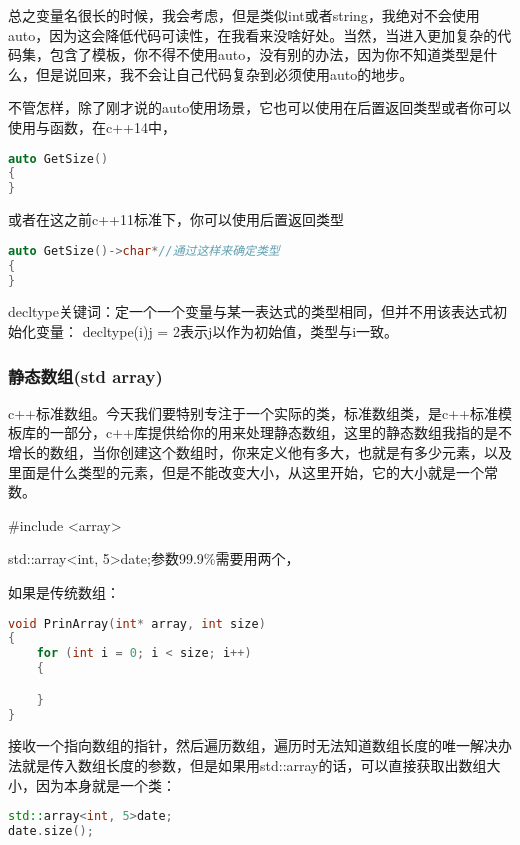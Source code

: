 总之变量名很长的时候，我会考虑，但是类似{\ncodestyle int}或者{\ncodestyle string}，我绝对不会使用{\ncodestyle auto}，因为这会降低代码可读性，在我看来没啥好处。当然，当进入更加复杂的代码集，包含了模板，你不得不使用{\ncodestyle auto}，没有别的办法，因为你不知道类型是什么，但是说回来，我不会让自己代码复杂到必须使用{\ncodestyle auto}的地步。

不管怎样，除了刚才说的{\ncodestyle auto}使用场景，它也可以使用在后置返回类型或者你可以使用与函数，在c++14中，

\begin{lstlisting}[language=c++]
auto GetSize()
{
}
\end{lstlisting}
或者在这之前c++11标准下，你可以使用后置返回类型
\begin{lstlisting}[language=c++]
auto GetSize()->char*//通过这样来确定类型
{
}
\end{lstlisting}

{\ncodestyle decltype}关键词：定一个一个变量与某一表达式的类型相同，但并不用该表达式初始化变量：
{\ncodestyle decltype(i)j = 2}表示{\ncodestyle j}以{}作为初始值，类型与{\ncodestyle i}一致。


\subsubsection{静态数组(std array)}

c++标准数组。今天我们要特别专注于一个实际的类，标准数组类，是c++标准模板库的一部分，c++库提供给你的用来处理静态数组，这里的静态数组我指的是不增长的数组，当你创建这个数组时，你来定义他有多大，也就是有多少元素，以及里面是什么类型的元素，但是不能改变大小，从这里开始，它的大小就是一个常数。

{\ncodestyle \#include <array>}

{\ncodestyle std::array<int, 5>date;}参数99.9\%需要用两个，

如果是传统数组：
\begin{lstlisting}[language=c++]
void PrinArray(int* array, int size)
{
    for (int i = 0; i < size; i++)
    {

    }
}
\end{lstlisting}

接收一个指向数组的指针，然后遍历数组，遍历时无法知道数组长度的唯一解决办法就是传入数组长度的参数，但是如果用{\ncodestyle std::array}的话，可以直接获取出数组大小，因为本身就是一个类：

\begin{lstlisting}[language=c++]
std::array<int, 5>date;
date.size();
\end{lstlisting}


